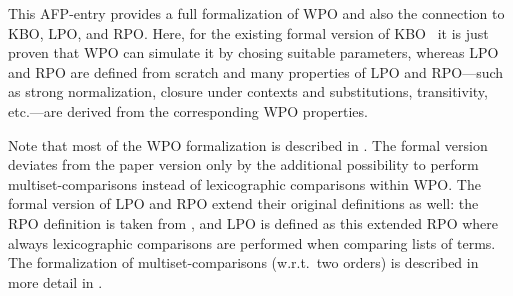 \documentclass[11pt,a4paper]{article}
\begin{document}
This AFP-entry provides a full formalization of WPO and also the connection to KBO, LPO, and RPO.
Here, for the existing formal version of KBO~\cite{KBO_form_paper,Knuth_Bendix_Order-AFP} it is just proven that WPO can simulate it by chosing suitable parameters, 
whereas LPO and RPO are defined from scratch and many properties  of LPO and RPO---such as strong normalization, closure under
contexts and substitutions, transitivity, etc.---are derived from the 
corresponding WPO properties.

Note that most of the WPO formalization is described in \cite{WPO_form_paper}.
The formal version deviates from the paper version
only by the additional possibility to perform multiset-comparisons instead
of lexicographic comparisons within WPO. 
The formal version of LPO and RPO extend their original definitions as well: the RPO definition is 
taken from \cite{RPO_def}, 
and LPO is defined as this extended RPO where always
lexicographic comparisons are performed when comparing lists of terms.
The formalization of multiset-comparisons (w.r.t.\ two orders) is described in more detail in \cite{RPO_def}.







\end{document}
